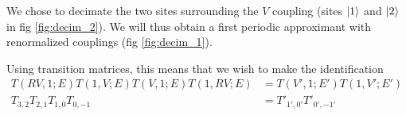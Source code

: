 \documentclass[11pt]{article}
\begin{document}
We chose to decimate the two sites surrounding the $V$ coupling (sites $\ket{1}$ and $\ket{2}$ in fig \eqref{fig:decim_2}). We will thus obtain a first periodic approximant with renormalized couplings (fig \eqref{fig:decim_1}).

Using transition matrices, this means that we wish to make the identification
\begin{align}
	T(RV,1;E)T(1,V;E)T(V,1;E)T(1,RV;E) & = T(V',1;E')T(1,V';E') \\
	T_{3,2}T_{2,1}T_{1,0}T_{0,-1} &= T'_{1',0'}T'_{0',-1'}
\end{align}
{}

\end{document}
